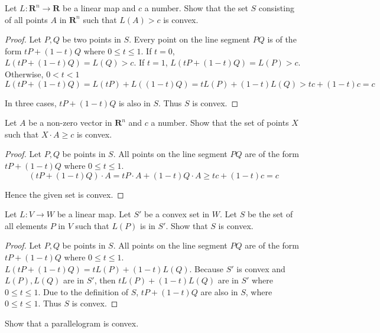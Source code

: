 \begin{exercise}
    Let $L: \mathbf{R}^{n}\to \mathbf{R}$ be a linear map and $c$ a number. Show that the set $S$ consisting of all points $A$ in $\mathbf{R}^{n}$ such that $L(A) > c$ is convex.
\end{exercise}

\begin{proof}
    Let $P, Q$ be two points in $S$. Every point on the line segment $PQ$ is of the form $tP + (1 - t)Q$ where $0\leq t \leq 1$. If $t = 0$, $L(tP + (1-t)Q) = L(Q) > c$. If $t = 1$, $L(tP + (1-t)Q) = L(P) > c$. Otherwise, $0 < t < 1$
    \[
        L(tP + (1-t)Q) = L(tP) + L((1-t)Q) = tL(P) + (1-t)L(Q) > tc + (1-t)c = c
    \]

    In three cases, $tP + (1-t)Q$ is also in $S$. Thus $S$ is convex.
\end{proof}

\begin{exercise}
    Let $A$ be a non-zero vector in $\mathbf{R}^{n}$ and $c$ a number. Show that the set of points $X$ such that $X\cdot A \geq c$ is convex.
\end{exercise}

\begin{proof}
    Let $P, Q$ be points in $S$. All points on the line segment $PQ$ are of the form $tP + (1-t)Q$ where $0 \leq t \leq 1$.
    \[
        (tP + (1-t)Q)\cdot A = tP\cdot A + (1-t)Q\cdot A \geq tc + (1-t)c = c
    \]

    Hence the given set is convex.
\end{proof}

\begin{exercise}
    Let $L: V\to W$ be a linear map. Let $S'$ be a convex set in $W$. Let $S$ be the set of all elements $P$ in $V$ such that $L(P)$ is in $S'$. Show that $S$ is convex.
\end{exercise}

\begin{proof}
    Let $P, Q$ be points in $S$. All points on the line segment $PQ$ are of the form $tP + (1-t)Q$ where $0 \leq t \leq 1$. $L(tP + (1-t)Q) = tL(P) + (1-t)L(Q)$. Because $S'$ is convex and $L(P), L(Q)$ are in $S'$, then $tL(P) + (1-t)L(Q)$ are in $S'$ where $0\leq t\leq 1$. Due to the definition of $S$, $tP + (1-t)Q$ are also in $S$, where $0\leq t\leq 1$. Thus $S$ is convex.
\end{proof}

\begin{exercise}
    Show that a parallelogram is convex.
\end{exercise}

